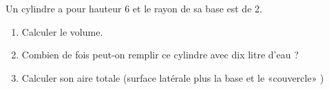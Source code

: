 
\begin{exercice}\label{exosmath-0009}

    Un cylindre a pour hauteur \unit{6}{\centi\meter} et le rayon de sa base est de \unit{2}{\centi\meter}.
    \begin{enumerate}
        \item
            Calculer le volume.
        \item
            Combien de fois peut-on remplir ce cylindre avec dix litre d'eau ?
        \item
            Calculer son aire totale (surface latérale plus la base et le «couvercle» )
    \end{enumerate}

\end{exercice}
